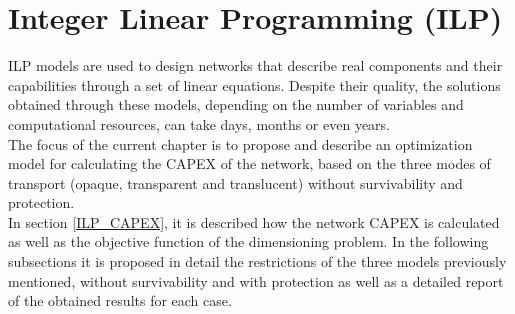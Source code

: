 
\chapter{Integer Linear Programming (ILP)}

ILP models are used to design networks that describe real components and their capabilities through a set of linear equations. Despite their quality, the solutions obtained through these models, depending on the number of variables and computational resources, can take days, months or even years.\\
The focus of the current chapter is to propose and describe an optimization model for calculating the CAPEX of the network, based on the three modes of transport (opaque, transparent and translucent) without survivability and protection.\\
In section \ref{ILP_CAPEX}, it is described how the network CAPEX is calculated as well as the objective function of the dimensioning problem. In the following subsections it is proposed in detail the restrictions of the three models previously mentioned, without survivability and with protection as well as a detailed report of the obtained results for each case.\\








